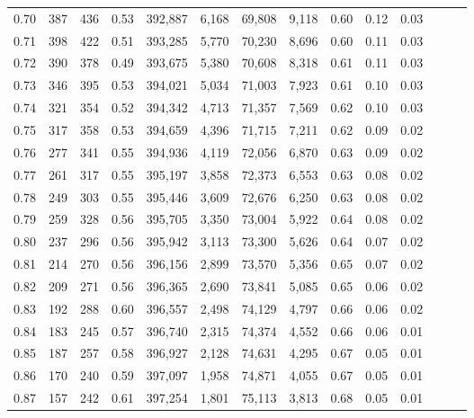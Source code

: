 \begin{tabular}{rrrrrrrrrrrrrr}
0.70 &     387 &    436 &  0.53 &  392,887 &    6,168 &  69,808 &   9,118 &  0.60 &  0.12 &      0.03 \\
0.71 &     398 &    422 &  0.51 &  393,285 &    5,770 &  70,230 &   8,696 &  0.60 &  0.11 &      0.03 \\
0.72 &     390 &    378 &  0.49 &  393,675 &    5,380 &  70,608 &   8,318 &  0.61 &  0.11 &      0.03 \\
0.73 &     346 &    395 &  0.53 &  394,021 &    5,034 &  71,003 &   7,923 &  0.61 &  0.10 &      0.03 \\
0.74 &     321 &    354 &  0.52 &  394,342 &    4,713 &  71,357 &   7,569 &  0.62 &  0.10 &      0.03 \\
0.75 &     317 &    358 &  0.53 &  394,659 &    4,396 &  71,715 &   7,211 &  0.62 &  0.09 &      0.02 \\
0.76 &     277 &    341 &  0.55 &  394,936 &    4,119 &  72,056 &   6,870 &  0.63 &  0.09 &      0.02 \\
0.77 &     261 &    317 &  0.55 &  395,197 &    3,858 &  72,373 &   6,553 &  0.63 &  0.08 &      0.02 \\
0.78 &     249 &    303 &  0.55 &  395,446 &    3,609 &  72,676 &   6,250 &  0.63 &  0.08 &      0.02 \\
0.79 &     259 &    328 &  0.56 &  395,705 &    3,350 &  73,004 &   5,922 &  0.64 &  0.08 &      0.02 \\
0.80 &     237 &    296 &  0.56 &  395,942 &    3,113 &  73,300 &   5,626 &  0.64 &  0.07 &      0.02 \\
0.81 &     214 &    270 &  0.56 &  396,156 &    2,899 &  73,570 &   5,356 &  0.65 &  0.07 &      0.02 \\
0.82 &     209 &    271 &  0.56 &  396,365 &    2,690 &  73,841 &   5,085 &  0.65 &  0.06 &      0.02 \\
0.83 &     192 &    288 &  0.60 &  396,557 &    2,498 &  74,129 &   4,797 &  0.66 &  0.06 &      0.02 \\
0.84 &     183 &    245 &  0.57 &  396,740 &    2,315 &  74,374 &   4,552 &  0.66 &  0.06 &      0.01 \\
0.85 &     187 &    257 &  0.58 &  396,927 &    2,128 &  74,631 &   4,295 &  0.67 &  0.05 &      0.01 \\
0.86 &     170 &    240 &  0.59 &  397,097 &    1,958 &  74,871 &   4,055 &  0.67 &  0.05 &      0.01 \\
0.87 &     157 &    242 &  0.61 &  397,254 &    1,801 &  75,113 &   3,813 &  0.68 &  0.05 &      0.01 \\

\end{tabular}
